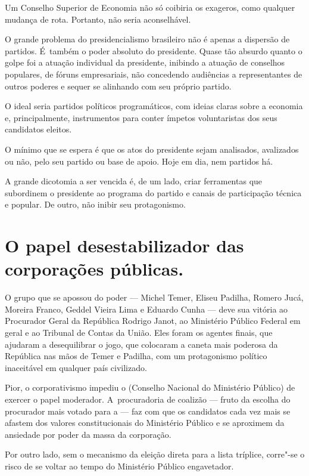 Um Conselho Superior de Economia não só coibiria os exageros, como
qualquer mudança de rota. Portanto, não seria aconselhável.

O grande problema do presidencialismo brasileiro não é apenas a
dispersão de partidos. É~também o poder absoluto do presidente. Quase
tão absurdo quanto o golpe foi a atuação individual da presidente,
inibindo a atuação de conselhos populares, de fóruns empresariais, não
concedendo audiências a representantes de outros poderes e sequer se
alinhando com seu próprio partido.

O ideal seria partidos políticos programáticos, com ideias claras sobre
a economia e, principalmente, instrumentos para conter ímpetos
voluntaristas dos seus candidatos eleitos.

O mínimo que se espera é que os atos do presidente sejam analisados,
avalizados ou não, pelo seu partido ou base de apoio. Hoje em dia, nem
partidos há.

A grande dicotomia a ser vencida é, de um lado, criar ferramentas que
subordinem o presidente ao programa do partido e canais de participação
técnica e popular. De outro, não inibir seu protagonismo.

\section{O papel desestabilizador das corporações públicas.}

O grupo que se apossou do poder --- Michel Temer, Eliseu Padilha, Romero
Jucá, Moreira Franco, Geddel Vieira Lima e Eduardo Cunha --- deve sua
vitória ao Procurador Geral da República Rodrigo Janot, ao Ministério
Público Federal em geral e ao Tribunal de Contas da União. Eles foram os
agentes finais, que ajudaram a desequilibrar o jogo, que colocaram a
caneta mais poderosa da República nas mãos de Temer e Padilha, com um
protagonismo político inaceitável em qualquer país civilizado.

Pior, o corporativismo impediu o  (Conselho Nacional do Ministério
Público) de exercer o papel moderador. A~procuradoria de coalizão ---
fruto da escolha do procurador mais votado para a  --- faz com que os
candidatos cada vez mais se afastem dos valores constitucionais do
Ministério Público e se aproximem da ansiedade por poder da massa da
corporação.

Por outro lado, sem o mecanismo da eleição direta para a lista tríplice,
corre"-se o risco de se voltar ao tempo do Ministério Público
engavetador.

